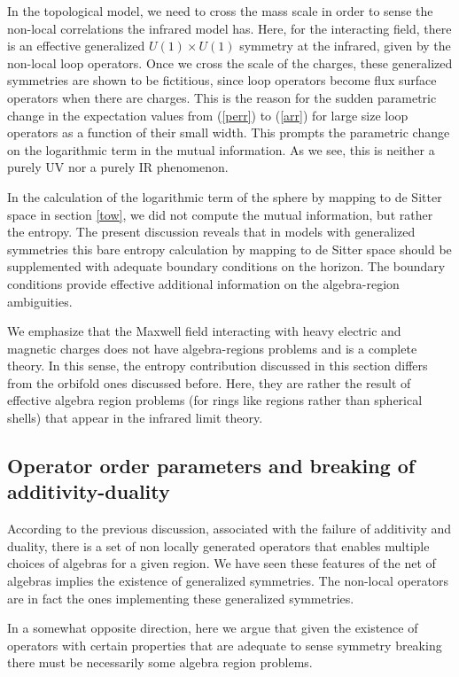 \documentclass[11pt]{article}
\numberwithin{equation}{section}
\begin{document}
In the topological model, we need to cross the mass scale in order to sense the non-local correlations the infrared model has. Here, for the interacting field, there is an effective generalized $U(1)\times U(1)$ symmetry at the infrared, given by the non-local loop operators. Once we cross the scale of the charges, these generalized symmetries are shown to be fictitious, since loop operators become flux surface operators when there are charges. This is the reason for the sudden parametric change in the expectation values from (\ref{perr}) to (\ref{arr}) for large size loop operators as a function of their small width. This prompts the parametric change on the logarithmic term in the mutual information. As we see, this is neither a purely UV nor a purely IR phenomenon.     

In the calculation of the logarithmic term of the sphere by mapping to de Sitter space in section \ref{tow}, we did not compute the mutual information, but rather the entropy. The present discussion reveals that in models with generalized symmetries this bare entropy calculation by mapping to de Sitter space should be supplemented with adequate boundary conditions on the horizon.  The boundary conditions provide effective additional information on the algebra-region ambiguities.

We emphasize that the Maxwell field interacting with heavy electric and magnetic charges does not have algebra-regions problems and is a complete theory. In this sense, the entropy contribution discussed in this section differs from the orbifold ones discussed before. Here, they are rather the result of effective algebra region problems (for rings like regions rather than spherical shells) that appear in the infrared limit theory. 


\subsection{Operator order parameters and breaking of additivity-duality}

According to the previous discussion, associated with the failure of additivity and duality, there is a set of non locally generated operators that enables multiple choices of algebras for a given region. We have seen these features of the net of algebras implies the existence of generalized symmetries. The non-local operators are in fact the ones implementing these generalized symmetries.

In a somewhat opposite direction, here we argue that given the existence of operators with certain properties that are adequate to sense symmetry breaking there must be necessarily some algebra region problems. 
\end{document}
